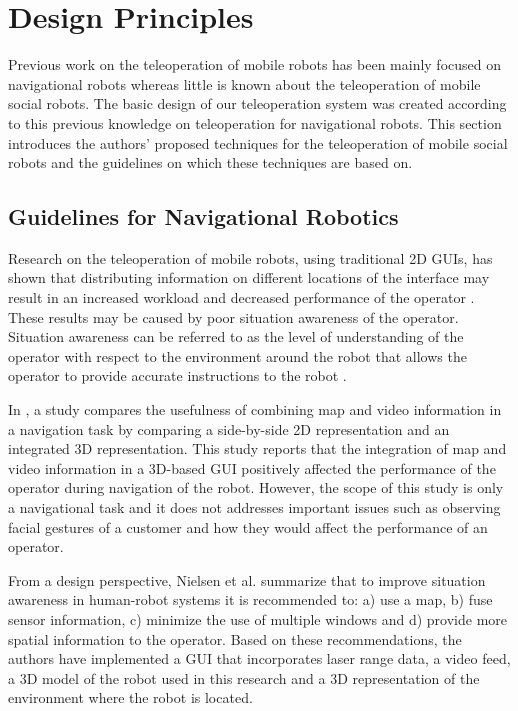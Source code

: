 \documentclass[journal]{IEEEtran}
\begin{document}
\section{Design Principles}
Previous work on the teleoperation of mobile robots has been mainly focused on navigational robots whereas little is known about the teleoperation of mobile social robots.
The basic design of our teleoperation system was created according to this previous knowledge on teleoperation for navigational robots.
This section introduces the authors' proposed techniques for the teleoperation of mobile social robots and the guidelines on which these techniques are based on.

\subsection{Guidelines for Navigational Robotics}
Research on the teleoperation of mobile robots, using traditional 2D GUIs, has shown that distributing information on different locations of the interface may result in an increased workload and decreased performance of the operator \cite{nielsen:ecological}.
These results may be caused by poor situation awareness of the operator.
Situation awareness can be referred to as the level of understanding of the operator with respect to the environment around the robot that allows the operator to provide accurate instructions to the robot \cite{nofi:defining}.

In \cite{nielsen:comparing}, a study compares the usefulness of combining map and video information in a navigation task by comparing a side-by-side 2D representation and an integrated 3D representation.
This study reports that the integration of map and video information in a 3D-based GUI positively affected the performance of the operator during navigation of the robot.
However, the scope of this study is only a navigational task and it does not addresses important issues such as observing facial gestures of a customer and how they would affect the performance of an operator.

From a design perspective, Nielsen et al. \cite{nielsen:ecological} summarize that to improve situation awareness in human-robot systems it is recommended to: a) use a map, b) fuse sensor information, c) minimize the use of multiple windows and d) provide more spatial information to the operator.
Based on these recommendations, the authors have implemented a GUI that incorporates laser range data, a video feed, a 3D model of the robot used in this research and a 3D representation of the environment where the robot is located.
\end{document}
